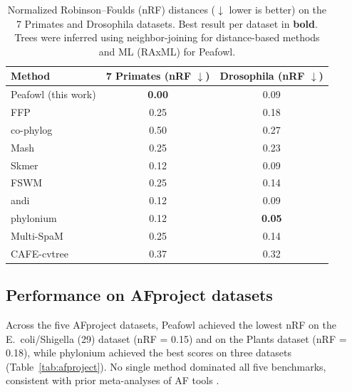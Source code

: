 \documentclass[11pt]{article}
\begin{document}
\begin{table}[H]
\centering
\caption{Normalized Robinson--Foulds (nRF) distances ($\downarrow$ lower is better) on the 7 Primates and Drosophila datasets. Best result per dataset in \textbf{bold}. Trees were inferred using neighbor-joining for distance-based methods and ML (RAxML) for Peafowl.}
\label{tab:primates_drosophila}
\begin{tabular}{lcc}
\toprule
\textbf{Method} & \textbf{7 Primates (nRF $\downarrow$)} & \textbf{Drosophila (nRF $\downarrow$)} \\
\midrule
Peafowl (this work) & \textbf{0.00} & 0.09 \\
FFP & 0.25 & 0.18 \\
co-phylog & 0.50 & 0.27 \\
Mash & 0.25 & 0.23 \\
Skmer & 0.12 & 0.09 \\
FSWM & 0.25 & 0.14 \\
andi & 0.12 & 0.09 \\
phylonium & 0.12 & \textbf{0.05} \\
Multi-SpaM & 0.25 & 0.14 \\
CAFE-cvtree & 0.37 & 0.32 \\
\bottomrule
\end{tabular}
\end{table}

\subsection{Performance on AFproject datasets}

Across the five AFproject datasets, Peafowl achieved the lowest nRF on the E.~coli/Shigella (29) dataset (nRF = 0.15) and on the Plants dataset (nRF = 0.18), while phylonium achieved the best scores on three datasets (Table~\ref{tab:afproject}). No single method dominated all five benchmarks, consistent with prior meta-analyses of AF tools \citep{zielezinski2019}.
\end{document}
